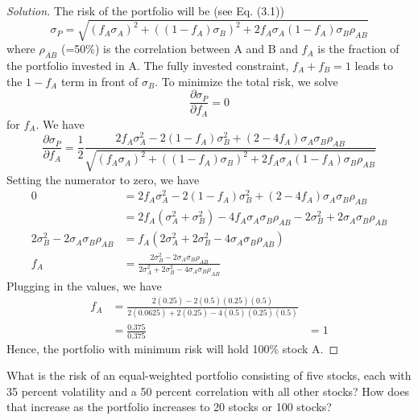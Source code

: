 \begin{proof}[Solution]
 The risk of the portfolio will be (see Eq. (3.1))
 \begin{equation*}
  \sigma_{P} = \sqrt{ (f_{A} \sigma_{A})^2 + ((1-f_{A})\sigma_{B})^{2} + 2f_{A}\sigma_{A}(1-f_{A})\sigma_{B}\rho_{AB}}
 \end{equation*}
 where $\rho_{AB}$ (=50\%) is the correlation between A and B and $f_{A}$ is the fraction of the portfolio invested in A. The fully invested constraint, $f_{A}+f_{B}=1$ leads to the $1-f_{A}$ term in front of $\sigma_{B}$. To minimize the total risk, we solve 
 \begin{equation*}
  \frac{\partial \sigma_{P}}{\partial f_{A}} = 0
 \end{equation*}
 for $f_{A}$. We have
 \begin{equation}
  \frac{\partial \sigma_{P}}{\partial f_{A}} = \frac{1}{2}\frac{2f_{A}\sigma_{A}^{2}-2(1-f_{A})\sigma_{B}^{2}+(2-4f_{A})\sigma_{A}\sigma_{B}\rho_{AB}}{\sqrt{(f_{A} \sigma_{A})^2 + ((1-f_{A})\sigma_{B})^{2} + 2f_{A}\sigma_{A}(1-f_{A})\sigma_{B}\rho_{AB}}}
 \end{equation}
 Setting the numerator to zero, we have
 \begin{align*}
  0 &= 2f_{A}\sigma_{A}^{2}-2(1-f_{A})\sigma_{B}^{2}+(2-4f_{A})\sigma_{A}\sigma_{B}\rho_{AB}\\  
    &= 2f_{A}(\sigma_{A}^{2}+\sigma_{B}^{2})-4f_{A}\sigma_{A}\sigma_{B}\rho_{AB}-2\sigma_{B}^{2}+2\sigma_{A}\sigma_{B}\rho_{AB}\\  
    2\sigma_{B}^{2}-2\sigma_{A}\sigma_{B}\rho_{AB} &= f_{A}(2\sigma_{A}^{2}+2\sigma_{B}^{2}-4\sigma_{A}\sigma_{B}\rho_{AB})\\
    f_{A}&=\frac{2\sigma_{B}^{2}-2\sigma_{A}\sigma_{B}\rho_{AB}}{2\sigma_{A}^{2}+2\sigma_{B}^{2}-4\sigma_{A}\sigma_{B}\rho_{AB}}
 \end{align*}
 Plugging in the values, we have
 \begin{align*}
    f_{A}&=\frac{2(0.25)-2(0.5)(0.25)(0.5)}{2(0.0625)+2(0.25)-4(0.5)(0.25)(0.5)}\\
         &=\frac{0.375}{0.375}
         &=1
 \end{align*}
 Hence, the portfolio with minimum risk will hold 100\% stock A.

\end{proof}

\begin{problem}{3.3}
 What is the risk of an equal-weighted portfolio consisting of five stocks, each with 35 percent volatility and a 50 percent correlation with all other stocks? How does that increase as the portfolio increases to 20 stocks or 100 stocks?
\end{problem}

